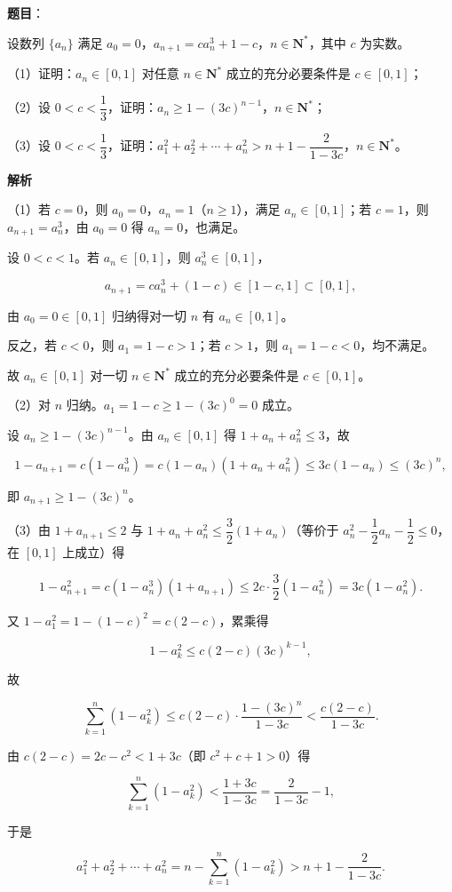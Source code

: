 \begin{answer}

\textbf{题目}：

设数列 $\{a_n\}$ 满足 $a_0=0$，$a_{n+1}=ca_n^3+1-c$，$n\in\mathbf N^*$，其中 $c$ 为实数。

（1）证明：$a_n\in[0,1]$ 对任意 $n\in\mathbf N^*$ 成立的充分必要条件是 $c\in[0,1]$；

（2）设 $0<c<\dfrac13$，证明：$a_n\geqslant1-(3c)^{n-1}$，$n\in\mathbf N^*$；

（3）设 $0<c<\dfrac13$，证明：$a_1^2+a_2^2+\cdots+a_n^2>n+1-\dfrac{2}{1-3c}$，$n\in\mathbf N^*$。

\textbf{解析}

（1）若 $c=0$，则 $a_0=0$，$a_n=1$（$n\geqslant1$），满足 $a_n\in[0,1]$；若 $c=1$，则 $a_{n+1}=a_n^3$，由 $a_0=0$ 得 $a_n=0$，也满足。

设 $0<c<1$。若 $a_n\in[0,1]$，则 $a_n^3\in[0,1]$，

\nopagebreak[4]
\[a_{n+1}=ca_n^3+(1-c)\in[1-c,1]\subset[0,1],\]

由 $a_0=0\in[0,1]$ 归纳得对一切 $n$ 有 $a_n\in[0,1]$。

反之，若 $c<0$，则 $a_1=1-c>1$；若 $c>1$，则 $a_1=1-c<0$，均不满足。

故 $a_n\in[0,1]$ 对一切 $n\in\mathbf N^*$ 成立的充分必要条件是 $c\in[0,1]$。

（2）对 $n$ 归纳。$a_1=1-c\geqslant1-(3c)^0=0$ 成立。

设 $a_n\geqslant1-(3c)^{n-1}$。由 $a_n\in[0,1]$ 得 $1+a_n+a_n^2\leqslant3$，故

\nopagebreak[4]
\[1-a_{n+1}=c(1-a_n^3)=c(1-a_n)(1+a_n+a_n^2)\leqslant3c(1-a_n)\leqslant(3c)^n,\]

即 $a_{n+1}\geqslant1-(3c)^n$。

（3）由 $1+a_{n+1}\leqslant2$ 与 $1+a_n+a_n^2\leqslant\dfrac32(1+a_n)$（等价于 $a_n^2-\dfrac12a_n-\dfrac12\leqslant0$，在 $[0,1]$ 上成立）得

\nopagebreak[4]
\[1-a_{n+1}^2=c(1-a_n^3)(1+a_{n+1})\leqslant2c\cdot\frac32(1-a_n^2)=3c(1-a_n^2).\]

又 $1-a_1^2=1-(1-c)^2=c(2-c)$，累乘得

\nopagebreak[4]
\[1-a_k^2\leqslant c(2-c)(3c)^{k-1},\]

故

\nopagebreak[4]
\[\sum_{k=1}^n\left(1-a_k^2\right)\leqslant c(2-c)\cdot\frac{1-(3c)^n}{1-3c}<\frac{c(2-c)}{1-3c}.\]

由 $c(2-c)=2c-c^2<1+3c$（即 $c^2+c+1>0$）得

\nopagebreak[4]
\[\sum_{k=1}^n\left(1-a_k^2\right)<\frac{1+3c}{1-3c}=\frac2{1-3c}-1,\]

于是

\nopagebreak[4]
\[a_1^2+a_2^2+\cdots+a_n^2=n-\sum_{k=1}^n\left(1-a_k^2\right)>n+1-\frac2{1-3c}.\]


\end{answer}
